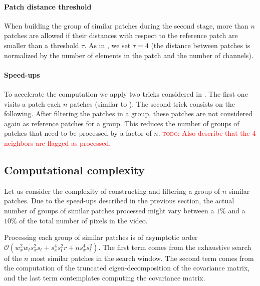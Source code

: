 \documentclass[10pt, journal, twocolumn, final, a4paper]{IEEEtran}
\newcommand{\todo}[1]{\textcolor{red}{\noindent\textsc{todo}: #1}}
\begin{document}

\paragraph{Patch distance threshold} When building the group of similar
patches during the second stage, more than $n$ patches are allowed
if their distances with respect to the reference patch are smaller than a
threshold $\tau$.  As in \cite{Lebrun2013ipol}, we set $\tau = 4$ (the distance between
patches is normalized by the number of elements in the patch and the number of
channels).

\paragraph{Speed-ups} To accelerate the computation we apply two tricks
considered in \cite{Lebrun2013ipol}. The first one visits a patch each $n$
patches (similar to \cite{Dabov2007tip}). The second trick consists on the following.
After filtering the patches in a group, these patches are not considered again
as reference patches for a group. This reduces the number of groups of patches
that need to be processed by a factor of $n$.
\todo{Also describe that the 4 neighbors are flagged as processed.}


\subsection{Computational complexity}
\label{sec:complexity}

Let us consider the complexity of constructing and filtering a group of
$n$ similar patches. Due to the speed-ups described in the
previous section, the actual number of groups of similar patches processed
might vary between a $1\%$ and a $10\%$ of the total number of pixels in the
video. 

Processing each group of similar patches is of asymptotic order $\mathcal
O(w_x^2 w_t s_x^2 s_t + s_x^4s_t^2r + ns_x^4s_t^2)$.
The first term comes from the exhaustive search of the $n$ most
similar patches in the search window. 
The second term comes from the computation of the truncated eigen-decomposition
of the covariance matrix, and the last term contemplates computing the
covariance matrix.
\end{document}
